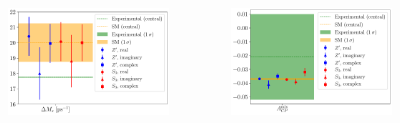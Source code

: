 \documentclass[mathserif, 10pt]{beamer}
\begin{document}
\begin{frame}
\begin{figure}
\begin{columns}
\begin{column}{0.48\textwidth}
            \end{column}
        \end{columns}
    \end{figure}
    \begin{figure}
        \begin{columns}
            \begin{column}{0.48\textwidth}
                \centering
                \includegraphics[width = 0.8\textwidth]{figures/errorplot_DMsmodels.pdf}
            \end{column}
            \begin{column}{0.48\textwidth}
                \centering
                \includegraphics[width = 0.8\textwidth]{figures/errorplot_ACPmodels.pdf}
            \end{column}
        \end{columns}
    \end{figure}
\end{frame}
\end{document}
